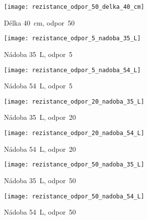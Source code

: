\begin{figure}[h]
	\label{img:pic_rezistance_odpor_50_delka_40_cm}
	\begin{center}
		\texttt{[image: rezistance\_odpor\_50\_delka\_40\_cm]}
		\caption{Délka 40~cm, odpor~50}
	\end{center}
\end{figure}

\begin{figure}[h]
	\label{img:pic_rezistance_odpor_5_nadoba_35_L}
	\begin{center}
		\texttt{[image: rezistance\_odpor\_5\_nadoba\_35\_L]}
		\caption{Nádoba 35~L, odpor~5}
	\end{center}
\end{figure}

\begin{figure}[h]
	\label{img:pic_rezistance_odpor_5_nadoba_54_L}
	\begin{center}
		\texttt{[image: rezistance\_odpor\_5\_nadoba\_54\_L]}
		\caption{Nádoba 54~L, odpor~5}
	\end{center}
\end{figure}

\begin{figure}[h]
	\label{img:pic_rezistance_odpor_20_nadoba_35_L}
	\begin{center}
		\texttt{[image: rezistance\_odpor\_20\_nadoba\_35\_L]}
		\caption{Nádoba 35~L, odpor~20}
	\end{center}
\end{figure}

\begin{figure}[h]
	\label{img:pic_rezistance_odpor_20_nadoba_54_L}
	\begin{center}
		\texttt{[image: rezistance\_odpor\_20\_nadoba\_54\_L]}
		\caption{Nádoba 54~L, odpor~20}
	\end{center}
\end{figure}

\begin{figure}[h]
	\label{img:pic_rezistance_odpor_50_nadoba_35_L}
	\begin{center}
		\texttt{[image: rezistance\_odpor\_50\_nadoba\_35\_L]}
		\caption{Nádoba 35~L, odpor~50}
	\end{center}
\end{figure}

\begin{figure}[h]
	\label{img:pic_rezistance_odpor_50_nadoba_54_L}
	\begin{center}
		\texttt{[image: rezistance\_odpor\_50\_nadoba\_54\_L]}
		\caption{Nádoba 54~L, odpor~50}
	\end{center}
\end{figure}
